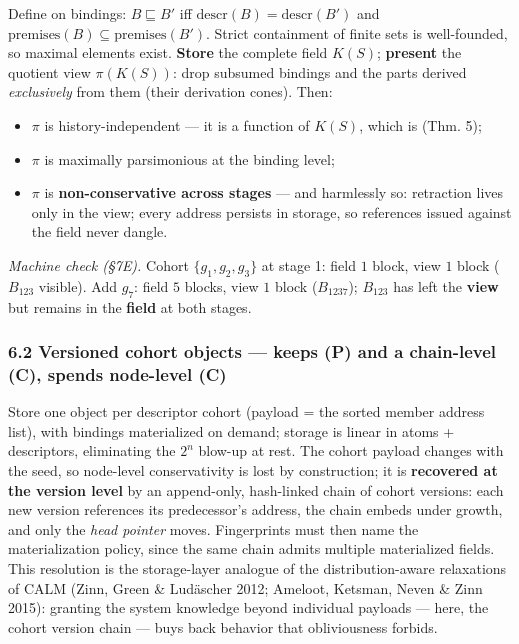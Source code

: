 \documentclass[
  10pt,
]{article}
\providecommand{\tightlist}{%
  \setlength{\itemsep}{0pt}\setlength{\parskip}{0pt}}
\begin{document}
Define on bindings: \(B \sqsubseteq B'\) iff
\(\mathrm{descr}(B) = \mathrm{descr}(B')\) and
\(\mathrm{premises}(B) \subseteq \mathrm{premises}(B')\). Strict
containment of finite sets is well-founded, so maximal elements exist.
\textbf{Store} the complete field \(K(S)\); \textbf{present} the
quotient view \(\pi(K(S))\): drop subsumed bindings and the parts
derived \emph{exclusively} from them (their derivation cones). Then:

\begin{itemize}
\tightlist
\item
  \(\pi\) is history-independent --- it is a function of \(K(S)\), which
  is (Thm. 5);
\item
  \(\pi\) is maximally parsimonious at the binding level;
\item
  \(\pi\) is \textbf{non-conservative across stages} --- and harmlessly
  so: retraction lives only in the view; every address persists in
  storage, so references issued against the field never dangle.
\end{itemize}

\emph{Machine check (§7E).} Cohort \(\{g_1,g_2,g_3\}\) at stage 1: field
\(1\) block, view \(1\) block (\(B_{123}\) visible). Add \(g_7\): field
\(5\) blocks, view \(1\) block (\(B_{1237}\)); \(B_{123}\) has left the
\textbf{view} but remains in the \textbf{field} at both stages.

\hypertarget{versioned-cohort-objects-keeps-p-and-a-chain-level-c-spends-node-level-c}{%
\subsubsection{6.2 Versioned cohort objects --- keeps (P) and a
chain-level (C), spends node-level
(C)}\label{versioned-cohort-objects-keeps-p-and-a-chain-level-c-spends-node-level-c}}

Store one object per descriptor cohort (payload = the sorted member
address list), with bindings materialized on demand; storage is linear
in atoms + descriptors, eliminating the \(2^n\) blow-up at rest. The
cohort payload changes with the seed, so node-level conservativity is
lost by construction; it is \textbf{recovered at the version level} by
an append-only, hash-linked chain of cohort versions: each new version
references its predecessor's address, the chain embeds under growth, and
only the \emph{head pointer} moves. Fingerprints must then name the
materialization policy, since the same chain admits multiple
materialized fields. This resolution is the storage-layer analogue of
the distribution-aware relaxations of CALM (Zinn, Green \& Ludäscher
2012; Ameloot, Ketsman, Neven \& Zinn 2015): granting the system
knowledge beyond individual payloads --- here, the cohort version chain
--- buys back behavior that obliviousness forbids.
\end{document}

